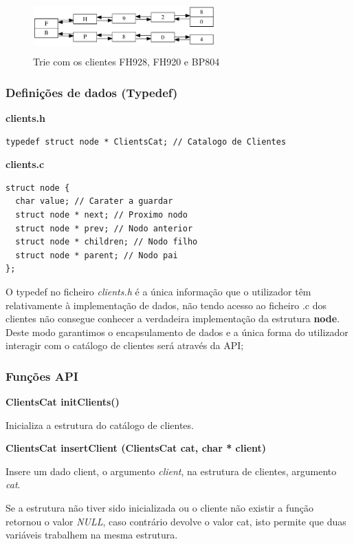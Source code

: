 \documentclass[10pt] {article}
\begin{document}
\begin{figure}[ht!]
\centering
\includegraphics[width=70mm, height=20mm]{trie.png}
\caption{Trie com os clientes FH928, FH920 e BP804}
\end{figure}

\subsubsection{Definições de dados (Typedef)}

\textbf{clients.h}
\begin{lstlisting}
typedef struct node * ClientsCat; // Catalogo de Clientes
\end{lstlisting}
\textbf{clients.c}
\begin{lstlisting}
struct node {
  char value; // Carater a guardar
  struct node * next; // Proximo nodo
  struct node * prev; // Nodo anterior
  struct node * children; // Nodo filho
  struct node * parent; // Nodo pai
};
\end{lstlisting}
\par {O typedef no ficheiro \emph{clients.h} é a única informação que o utilizador têm relativamente à implementação 
de dados, não tendo  acesso ao ficheiro .c dos clientes não consegue conhecer a verdadeira implementação da 
estrutura \textbf{node}. Deste modo garantimos o encapsulamento de dados e a única forma do utilizador interagir 
com o catálogo de clientes será através da API;} \\

\subsubsection{Funções API}

\noindent\textbf{ClientsCat initClients()}
\par Inicializa a estrutura do catálogo de clientes.

\noindent\textbf{ClientsCat insertClient (ClientsCat cat, char * client)}
\par Insere um dado client, o argumento \emph{client}, na estrutura de clientes, argumento \emph{cat}.
\par Se a estrutura não tiver sido inicializada ou o cliente não existir a função retornou o valor \emph{NULL},
caso contrário devolve o valor cat, isto permite que duas variáveis trabalhem na mesma estrutura. \\
\end{document}

